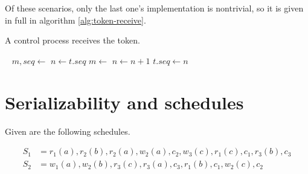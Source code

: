 \documentclass{article}
\begin{document}
Of these scenarios, only the last one's implementation is nontrivial, so it is
given in full in algorithm \ref{alg:token-receive}.

\begin{algorithm}[ht]
    \caption{A control process receives the token.}
    \label{alg:token-receive}
    \begin{algorithmic}
        \State ~
            \State $m, seq \gets$ 
                \State {}
            \EndFor
        \EndWhile
        \State $n \gets t.seq$
            \State $m \gets$ 
                \State {}
            \EndFor
                \State {}
            \EndFor
            \State $n \gets n + 1$
        \EndWhile
        \State $t.seq \gets n$
        \State {}
    \end{algorithmic}
\end{algorithm}

\section{Serializability and schedules}

Given are the following schedules.

\begin{align*}
    S_1 &= r_1 (a), r_2 (b), r_2 (a), w_2 (a), c_2, w_3 (c), r_1 (c), c_1, r_3 (b), c_3 \\
    S_2 &= w_1 (a), w_2 (b), r_3 (c), r_3 (a), c_3, r_1 (b), c_1, w_2 (c), c_2
\end{align*}
\end{document}
